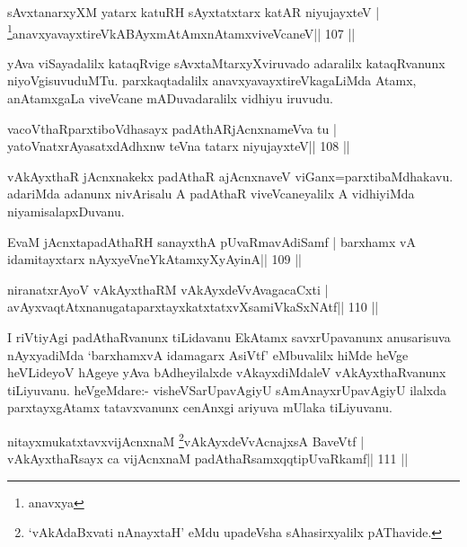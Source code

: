 \begin{shl}
sAvxtanarxyXM yatarx katuRH sAyxtatxtarx katAR niyujayxteV |
\footnote{anavxya}anavxyavayxtireVkABAyxmAtAmxnAtamxviveVcaneV\hfill || 107 ||
\end{shl}

\begin{artha}
yAva viSayadalilx kataqRvige sAvxtaMtarxyXviruvado adaralilx
kataqRvanunx niyoVgisuvuduMTu. parxkaqtadalilx
anavxyavayxtireVkagaLiMda Atamx, anAtamxgaLa viveVcane mADuvadaralilx
vidhiyu iruvudu.
\end{artha}


\begin{shl}
vacoVthaRparxtiboVdhasayx padAthARjAcnxnameVva tu |
yatoV\s natxrAyasatxdAdhxnw teVna tatarx niyujayxteV\hfill || 108 ||
\end{shl}

\begin{artha}
vAkAyxthaR jAcnxnakekx padAthaR ajAcnxnaveV viGanx=parxtibaMdhakavu. adariMda adanunx nivArisalu A padAthaR viveVcaneyalilx A vidhiyiMda niyamisalapxDuvanu.
\end{artha}

\begin{shl}
EvaM jAcnxtapadAthaRH sanayxthA pUvaRmavAdiSamf |
barxhamx vA idamitayxtarx nAyxyeVneYkAtamxyXyAyinA\hfill || 109 ||
\end{shl}

\begin{shl}
niranatxrAyoV vAkAyxthaRM vAkAyxdeVvAvagacaCxti |
avAyxvaqtAtxnanugataparxtayxkatxtatxvXsamiVkaSxNAtf\hfill || 110 ||
\end{shl}

\begin{artha}
I riVtiyAgi padAthaRvanunx tiLidavanu EkAtamx savxrUpavanunx anusarisuva nAyxyadiMda `barxhamxvA idamagarx AsiVtf' eMbuvalilx hiMde heVge heVLideyoV hAgeye yAva bAdheyilalxde vAkayxdiMdaleV vAkAyxthaRvanunx tiLiyuvanu. heVgeMdare:- visheVSarUpavAgiyU sAmAnayxrUpavAgiyU ilalxda parxtayxgAtamx tatavxvanunx cenAnxgi ariyuva mUlaka tiLiyuvanu.
\end{artha}


\begin{shl}
nitayxmukatxtavxvijAcnxnaM \footnote{`vAkAdaBxvati nAnayxtaH' eMdu upadeVsha
  sAhasirxyalilx pAThavide.}vAkAyxdeVvAcnajxsA BaveVtf |
vAkAyxthaRsayx ca vijAcnxnaM padAthaRsamxqqtipUvaRkamf\hfill || 111 ||
\end{shl}

